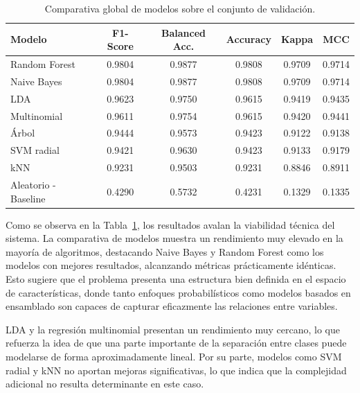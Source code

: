 \vspace{0.5cm}
\begin{table}[h]
    \centering
    \caption{Comparativa global de modelos sobre el conjunto de validación.}
    \vspace{0.2cm}
    \begin{tabular}{l c c c c c}
        \hline
        \textbf{Modelo} & \textbf{F1-Score} & \textbf{Balanced Acc.} & \textbf{Accuracy} & \textbf{Kappa} & \textbf{MCC} \\
        \hline
        Random Forest & 0.9804 & 0.9877 & 0.9808 & 0.9709 & 0.9714 \\
        Naive Bayes & 0.9804 & 0.9877 & 0.9808 & 0.9709 & 0.9714 \\
        LDA & 0.9623 & 0.9750 & 0.9615 & 0.9419 & 0.9435 \\
        Multinomial & 0.9611 & 0.9754 & 0.9615 & 0.9420 & 0.9441 \\
        Árbol & 0.9444 & 0.9573 & 0.9423 & 0.9122 & 0.9138 \\
        SVM radial & 0.9421 & 0.9630 & 0.9423 & 0.9133 & 0.9179 \\
        kNN & 0.9231 & 0.9503 & 0.9231 & 0.8846 & 0.8911 \\
        Aleatorio - Baseline & 0.4290 & 0.5732 & 0.4231 & 0.1329 & 0.1335 \\
        \hline
    \end{tabular}
    \label{tab:comparativa_modelos_test}
\end{table}
\vspace{0.5cm}

Como se observa en la Tabla~\ref{tab:comparativa_modelos_test}, los resultados avalan 
la viabilidad técnica del sistema. La comparativa de modelos muestra un rendimiento 
muy elevado en la mayoría de algoritmos, destacando Naive Bayes y Random Forest como
 los modelos con mejores resultados, alcanzando métricas prácticamente idénticas. Esto
  sugiere que el problema presenta una estructura bien definida en el espacio de características, 
  donde tanto enfoques probabilísticos como modelos basados en ensamblado son capaces de capturar 
  eficazmente las relaciones entre variables.

LDA y la regresión multinomial presentan un rendimiento muy cercano, lo que refuerza la idea de que 
una parte importante de la separación entre clases puede modelarse de forma aproximadamente lineal. 
Por su parte, modelos como SVM radial y kNN no aportan mejoras significativas, lo que indica que la 
complejidad adicional no resulta determinante en este caso.

